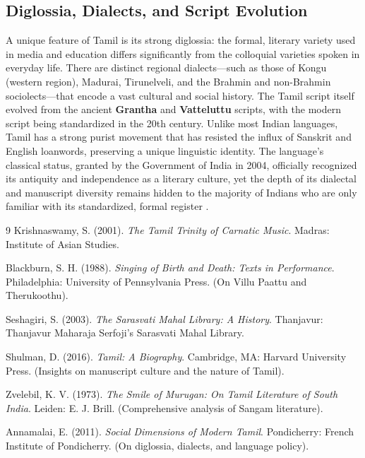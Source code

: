 \documentclass[12pt]{article}
\begin{document}
\subsection{Diglossia, Dialects, and Script Evolution}
A unique feature of Tamil is its strong diglossia: the formal, literary variety used in media and education differs significantly from the colloquial varieties spoken in everyday life. There are distinct regional dialects—such as those of Kongu (western region), Madurai, Tirunelveli, and the Brahmin and non-Brahmin sociolects—that encode a vast cultural and social history. The Tamil script itself evolved from the ancient \textbf{Grantha} and \textbf{Vatteluttu} scripts, with the modern script being standardized in the 20th century. Unlike most Indian languages, Tamil has a strong purist movement that has resisted the influx of Sanskrit and English loanwords, preserving a unique linguistic identity. The language's classical status, granted by the Government of India in 2004, officially recognized its antiquity and independence as a literary culture, yet the depth of its dialectal and manuscript diversity remains hidden to the majority of Indians who are only familiar with its standardized, formal register \cite{annamalai2011}.

\begin{thebibliography}{9}
    Krishnaswamy, S. (2001). \textit{The Tamil Trinity of Carnatic Music}. Madras: Institute of Asian Studies.

    Blackburn, S. H. (1988). \textit{Singing of Birth and Death: Texts in Performance}. Philadelphia: University of Pennsylvania Press. (On Villu Paattu and Therukoothu).

    Seshagiri, S. (2003). \textit{The Sarasvati Mahal Library: A History}. Thanjavur: Thanjavur Maharaja Serfoji's Sarasvati Mahal Library.

    Shulman, D. (2016). \textit{Tamil: A Biography}. Cambridge, MA: Harvard University Press. (Insights on manuscript culture and the nature of Tamil).

    Zvelebil, K. V. (1973). \textit{The Smile of Murugan: On Tamil Literature of South India}. Leiden: E. J. Brill. (Comprehensive analysis of Sangam literature).

    Annamalai, E. (2011). \textit{Social Dimensions of Modern Tamil}. Pondicherry: French Institute of Pondicherry. (On diglossia, dialects, and language policy).

\end{thebibliography}
\end{document}
